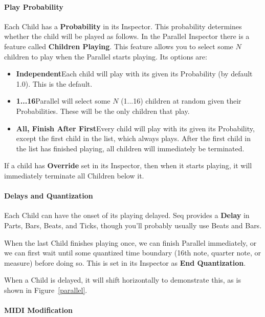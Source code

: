 \documentclass[twoside,10pt]{article}
\begin{document}
\paragraph{Play Probability}

Each Child has a {\bf Probability} in its Inspector.  This probability determines whether the child will be played as follows.  In the Parallel Inspector there is a feature called {\bf Children Playing}.  This feature allows you to select some \(N\) children to play when the Parallel starts playing.  Its options are:

\begin{itemize}
\item {\bf Independent}\quad Each child will play with its given its Probability (by default 1.0).  This is the default.
\item {\bf 1...16}\quad Parallel will select some \(N\) (1...16) children at random given their Probabilities.  These will be the only children that play.
\item {\bf All, Finish After First}\quad Every child will play with its given its Probability, except the first child in the list, which always plays.  After the first child in the list has finished playing, all children will immediately be terminated.
\end{itemize}

If a child has {\bf Override} set in its Inspector, then when it starts playing, it will immediately terminate all Children below it.  

\paragraph{Delays and Quantization}

Each Child can have the onset of its playing delayed.  Seq provides a {\bf Delay} in Parts, Bars, Beats, and Ticks, though you'll probably usually use Beats and Bars.

When the last Child finishes playing once, we can finish Parallel immediately, or we can first wait until some quantized time boundary (16th note, quarter note, or measure) before doing so.  This is set in its Inspector as {\bf End Quantization}.

When a Child is delayed, it will shift horizontally to demonstrate this, as is shown in Figure~\ref{parallel}.


\paragraph{MIDI Modification}
\end{document}
